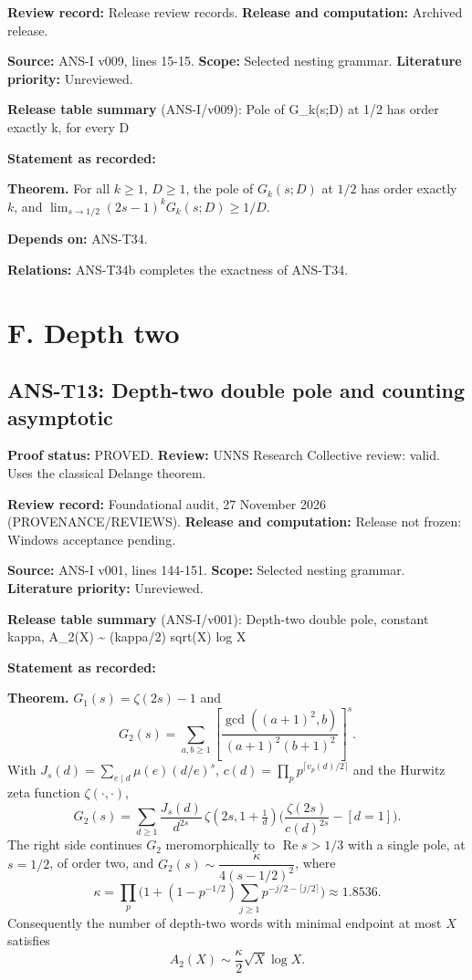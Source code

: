 \documentclass[
  11pt,
]{article}
\begin{document}
\textbf{Review record:} Release review records. \textbf{Release and
computation:} Archived release.

\textbf{Source:} ANS-I v009, lines 15-15. \textbf{Scope:} Selected
nesting grammar. \textbf{Literature priority:} Unreviewed.

\textbf{Release table summary} (ANS-I/v009): Pole of G\_k(s;D) at 1/2
has order exactly k, for every D

\textbf{Statement as recorded:}

\textbf{Theorem.} For all \(k\ge1\), \(D\ge1\), the pole of \(G_k(s;D)\)
at \(1/2\) has order exactly \(k\), and
\(\lim_{s\to1/2}(2s-1)^kG_k(s;D)\ge1/D\).

\textbf{Depends on:} ANS-T34.

\textbf{Relations:} ANS-T34b completes the exactness of ANS-T34.

\hypertarget{f.-depth-two}{%
\section{F. Depth two}\label{f.-depth-two}}

\hypertarget{ans-t13-depth-two-double-pole-and-counting-asymptotic}{%
\subsection{ANS-T13: Depth-two double pole and counting
asymptotic}\label{ans-t13-depth-two-double-pole-and-counting-asymptotic}}

\textbf{Proof status:} PROVED. \textbf{Review:} UNNS Research Collective
review: valid. Uses the classical Delange theorem.

\textbf{Review record:} Foundational audit, 27 November 2026
(PROVENANCE/REVIEWS). \textbf{Release and computation:} Release not
frozen: Windows acceptance pending.

\textbf{Source:} ANS-I v001, lines 144-151. \textbf{Scope:} Selected
nesting grammar. \textbf{Literature priority:} Unreviewed.

\textbf{Release table summary} (ANS-I/v001): Depth-two double pole,
constant kappa, A\_2(X) \textasciitilde{} (kappa/2) sqrt(X) log X

\textbf{Statement as recorded:}

\textbf{Theorem.} \(G_1(s)=\zeta(2s)-1\) and
\[G_2(s)=\sum_{a,b\ge1}\left[\frac{\gcd((a+1)^2,b)}{(a+1)^2(b+1)^2}\right]^{s}.\]
With \(J_s(d)=\sum_{e\mid d}\mu(e)(d/e)^s\),
\(c(d)=\prod_pp^{\lceil v_p(d)/2\rceil}\) and the Hurwitz zeta function
\(\zeta(\cdot,\cdot)\),
\[G_2(s)=\sum_{d\ge1}\frac{J_s(d)}{d^{2s}}\,\zeta\!\left(2s,1+\tfrac1d\right)\Big(\frac{\zeta(2s)}{c(d)^{2s}}-[d=1]\Big).\]
The right side continues \(G_2\) meromorphically to
\(\operatorname{Re}s>1/3\) with a single pole, at \(s=1/2\), of order
two, and \(G_2(s)\sim\dfrac{\kappa}{4(s-1/2)^2}\), where
\[\kappa=\prod_p\Big(1+(1-p^{-1/2})\sum_{j\ge1}p^{-j/2-\lceil j/2\rceil}\Big)\approx1.8536 .\]
Consequently the number of depth-two words with minimal endpoint at most
\(X\) satisfies \[A_2(X)\sim\frac{\kappa}{2}\sqrt X\log X .\]
\end{document}
